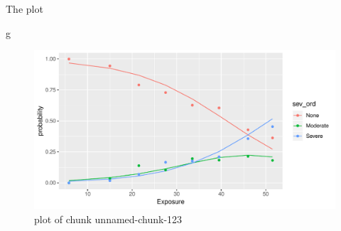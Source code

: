 \documentclass[ignorenonframetext,]{beamer}
\newenvironment{Shaded}{\begin{snugshade}}{\end{snugshade}}
\newcommand{\NormalTok}[1]{#1}
\begin{document}
\begin{frame}[fragile]{The plot}
\protect\hypertarget{the-plot-2}{}

\begin{Shaded}
\begin{Highlighting}[]
\NormalTok{g}
\end{Highlighting}
\end{Shaded}

\begin{figure}
\centering
\includegraphics{figure/unnamed-chunk-123-1.pdf}
\caption{plot of chunk unnamed-chunk-123}
\end{figure}

\end{frame}
\end{document}
